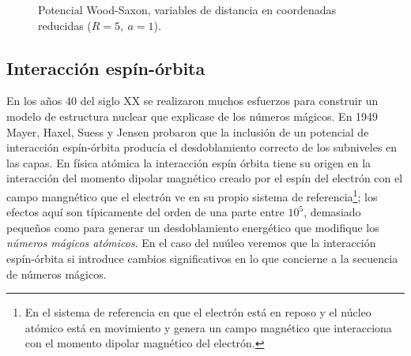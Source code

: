 \begin{figure}[h!] \centering
	\caption{Potencial Wood-Saxon, variables de distancia en coordenadas reducidas ($R = 5, \ a = 1$).}	
	\label{Fig:04-02}
\end{figure}

\subsection{Interacción espín-órbita}

En los años 40 del siglo XX se realizaron muchos esfuerzos para construir un modelo de estructura nuclear que explicase de los números mágicos. En 1949 Mayer, Haxel, Suess y Jensen probaron que la inclusión de un potencial de interacción espín-órbita producía el desdoblamiento correcto de los subniveles en las capas. En física atómica la interacción espín órbita tiene su origen en la interacción del momento dipolar magnético creado por el espín del electrón con el campo mangnético que el electrón ve en su propio sistema de referencia\footnote{En el sistema de referencia en que el electrón está en reposo y el núcleo atómico está en movimiento y genera un campo magnético que interacciona con el momento dipolar magnético del electrón.}; los efectos aquí son típicamente del orden de una parte entre $10^5$, demasiado pequeños como para generar un desdoblamiento energético que modifique los \textit{números mágicos atómicos}. En el caso del nuúleo veremos que la interacción espín-órbita si introduce cambios significativos en lo que concierne a la secuencia de números mágicos. 

